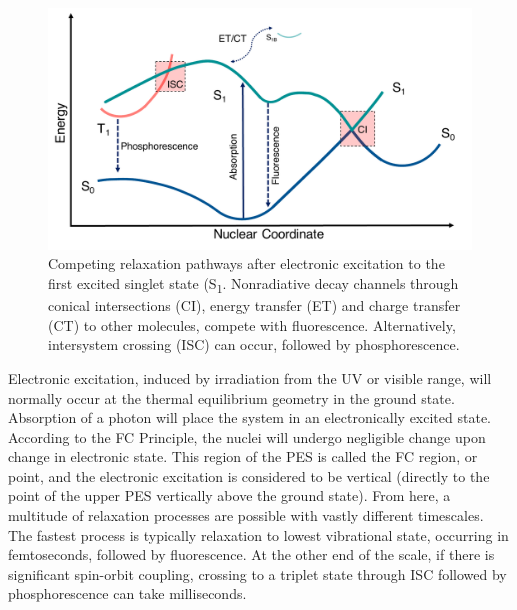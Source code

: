 \begin{figure}[H]
\centering
  \includegraphics[width=0.8\linewidth]{2Theory/Jablonski.pdf}
  \caption[Relaxation pathways post electronic excitation.]{Competing relaxation pathways after electronic excitation to the first excited singlet state (S\textsubscript{1}. Nonradiative decay channels through conical intersections (CI), energy transfer (ET) and charge transfer (CT) to other molecules, compete with fluorescence. Alternatively, intersystem crossing (ISC) can occur, followed by phosphorescence.}
  \label{figure: Jablonski}
\end{figure}

Electronic excitation, induced by irradiation from the \ac{UV} or visible range, will normally occur at the thermal equilibrium geometry in the ground state. Absorption of a photon will place the system in an electronically excited state. According to the \ac{FC} Principle, the nuclei will undergo negligible change upon change in electronic state. This region of the \ac{PES} is called the \ac{FC} region, or point, and the electronic excitation is considered to be vertical (directly to the point of the upper \ac{PES} vertically above the ground state). From here, a multitude of relaxation processes are possible with vastly different timescales. The fastest process is typically relaxation to lowest vibrational state, occurring in femtoseconds, followed by fluorescence. At the other end of the scale, if there is significant spin-orbit coupling, crossing to a triplet state through \ac{ISC} followed by phosphorescence can take milliseconds. 


